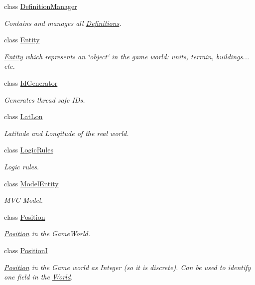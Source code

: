 \begin{DoxyCompactItemize}
class \hyperlink{classCore_1_1Models_1_1DefinitionManager}{Definition\+Manager}
\begin{DoxyCompactList}\small\item\em Contains and manages all \hyperlink{namespaceCore_1_1Models_1_1Definitions}{Definitions}. \end{DoxyCompactList}\item 
class \hyperlink{classCore_1_1Models_1_1Entity}{Entity}
\begin{DoxyCompactList}\small\item\em \hyperlink{classCore_1_1Models_1_1Entity}{Entity} which represents an \char`\"{}object\char`\"{} in the game world\+: units, terrain, buildings... etc. \end{DoxyCompactList}\item 
class \hyperlink{classCore_1_1Models_1_1IdGenerator}{Id\+Generator}
\begin{DoxyCompactList}\small\item\em Generates thread safe I\+Ds. \end{DoxyCompactList}\item 
class \hyperlink{classCore_1_1Models_1_1LatLon}{Lat\+Lon}
\begin{DoxyCompactList}\small\item\em Latitude and Longitude of the real world. \end{DoxyCompactList}\item 
class \hyperlink{classCore_1_1Models_1_1LogicRules}{Logic\+Rules}
\begin{DoxyCompactList}\small\item\em Logic rules. \end{DoxyCompactList}\item 
class \hyperlink{classCore_1_1Models_1_1ModelEntity}{Model\+Entity}
\begin{DoxyCompactList}\small\item\em M\+V\+C Model. \end{DoxyCompactList}\item 
class \hyperlink{classCore_1_1Models_1_1Position}{Position}
\begin{DoxyCompactList}\small\item\em \hyperlink{classCore_1_1Models_1_1Position}{Position} in the Game\+World. \end{DoxyCompactList}\item 
class \hyperlink{classCore_1_1Models_1_1PositionI}{Position\+I}
\begin{DoxyCompactList}\small\item\em \hyperlink{classCore_1_1Models_1_1Position}{Position} in the Game world as Integer (so it is discrete). Can be used to identify one field in the \hyperlink{classCore_1_1Models_1_1World}{World}. \end{DoxyCompactList}\item 

\end{DoxyCompactItemize}
